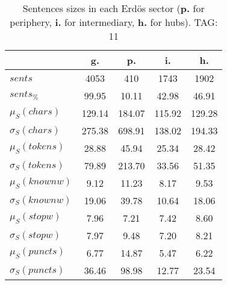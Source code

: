 \begin{table}[h!]
\begin{center}
\begin{tabular}{| l || c | c | c | c |}\hline
 & {\bf g.} & {\bf p.} & {\bf i.} & {\bf h.} \\\hline\hline
$sents$ & 4053  & 410  & 1743  & 1902 \\
$sents_{\%}$ & 99.95  & 10.11  & 42.98  & 46.91 \\\hline
$\mu_S(chars)$ & 129.14  & 184.07  & 115.92  & 129.28 \\
$\sigma_S(chars)$ & 275.38  & 698.91  & 138.02  & 194.33 \\\hline
$\mu_S(tokens)$ & 28.88  & 45.94  & 25.34  & 28.42 \\
$\sigma_S(tokens)$ & 79.89  & 213.70  & 33.56  & 51.35 \\\hline
$\mu_S(knownw)$ & 9.12  & 11.23  & 8.17  & 9.53 \\
$\sigma_S(knownw)$ & 19.06  & 39.78  & 10.64  & 18.06 \\\hline
$\mu_S(stopw)$ & 7.96  & 7.21  & 7.42  & 8.60 \\
$\sigma_S(stopw)$ & 7.97  & 9.48  & 7.20  & 8.21 \\\hline
$\mu_S(puncts)$ & 6.77  & 14.87  & 5.47  & 6.22 \\
$\sigma_S(puncts)$ & 36.46  & 98.98  & 12.77  & 23.54 \\\hline
\end{tabular}
\caption{Sentences sizes in each Erd\"os sector ({{\bf p.}} for periphery, {{\bf i.}} for intermediary, {{\bf h.}} for hubs). TAG: 11}
\end{center}
\end{table}